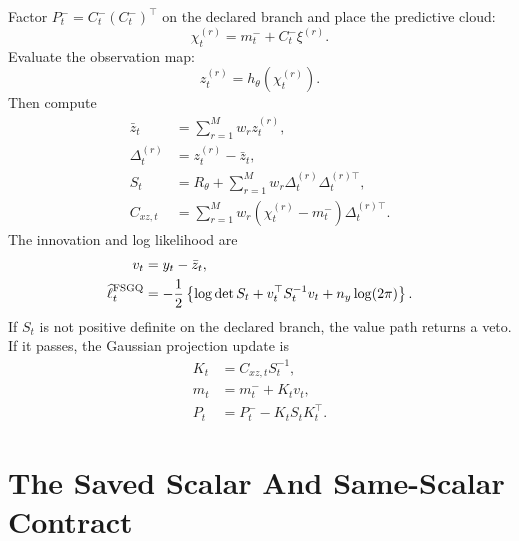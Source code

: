 \documentclass[11pt]{article}
\numberwithin{equation}{section}
\newcommand{\ellhat}{\widehat\ell}
\begin{document}
Factor \(P_t^-=C_t^-(C_t^-)^\top\) on the declared branch and place the
predictive cloud:
\begin{equation}
  \chi_t^{(r)}
  =
  m_t^-+C_t^-\xi^{(r)}.
  \label{eq:p31-obs-placed-points}
\end{equation}
Evaluate the observation map:
\begin{equation}
  z_t^{(r)}=h_\theta(\chi_t^{(r)}).
  \label{eq:p31-obs-values}
\end{equation}
Then compute
\begin{align}
  \bar z_t&=\sum_{r=1}^Mw_rz_t^{(r)},
  \label{eq:p31-obs-mean}\\
  \Delta_t^{(r)}&=z_t^{(r)}-\bar z_t,
  \label{eq:p31-obs-centered}\\
  S_t&=R_\theta+\sum_{r=1}^Mw_r
  \Delta_t^{(r)}\Delta_t^{(r)\top},
  \label{eq:p31-obs-cov}\\
  C_{xz,t}&=\sum_{r=1}^Mw_r
  (\chi_t^{(r)}-m_t^-)\Delta_t^{(r)\top}.
  \label{eq:p31-cross-cov}
\end{align}
The innovation and log likelihood are
\begin{align}
  v_t&=y_t-\bar z_t,
  \label{eq:p31-innovation}\\
  \ellhat_t^{\rm FSGQ}
  &=
  -\frac12
  \left\{\log\det S_t+v_t^\top S_t^{-1}v_t+n_y\log(2\pi)\right\}.
  \label{eq:p31-fsgq-loglik}
\end{align}
If \(S_t\) is not positive definite on the declared branch, the value path
returns a veto.  If it passes, the Gaussian projection update is
\begin{align}
  K_t&=C_{xz,t}S_t^{-1},
  \label{eq:p31-kalman-gain}\\
  m_t&=m_t^-+K_tv_t,
  \label{eq:p31-filter-mean}\\
  P_t&=P_t^- - K_tS_tK_t^\top.
  \label{eq:p31-filter-cov}
\end{align}

\section{The Saved Scalar And Same-Scalar Contract}
\label{sec:p31-same-scalar}
\end{document}
